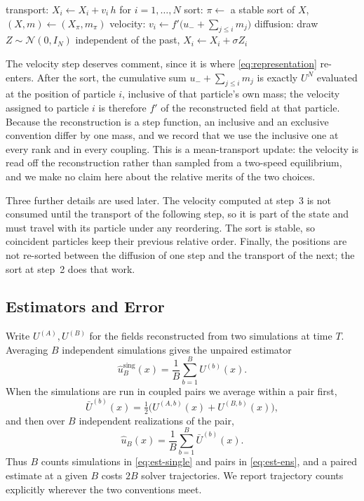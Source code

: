 \documentclass[smallextended,nospthms]{svjour3}
\theoremstyle{plain}
\theoremstyle{definition}
\theoremstyle{remark}
\numberwithin{equation}{section}
\begin{document}
\begin{algorithm}[htbp]
\caption{One step of a single simulation.}
\label{alg:single}
\SetAlgoLined
{}
transport: $X_i \leftarrow X_i + v_i\,h$ for $i=1,\dots,N$\;
sort: $\pi\leftarrow$ a stable sort of $X$, \quad $(X,m)\leftarrow(X_\pi,m_\pi)$\;
velocity: $v_i \leftarrow f'\!\bigl(u_- + \sum_{j\le i} m_j\bigr)$\;
diffusion: draw $Z\sim\mathcal N(0,I_N)$ independent of the past, \quad
  $X_i \leftarrow X_i + \sigma Z_i$\;
\end{algorithm}

The velocity step deserves comment, since it is where \eqref{eq:representation}
re-enters. After the sort, the cumulative sum $u_-+\sum_{j\le i}m_j$ is exactly
$U^N$ evaluated at the position of particle $i$, inclusive of that particle's
own mass; the velocity assigned to particle $i$ is therefore $f'$ of the
reconstructed field at that particle. Because the reconstruction is a step
function, an inclusive and an exclusive convention differ by one mass, and we
record that we use the inclusive one at every rank and in every coupling. This
is a mean-transport update: the velocity is read off the reconstruction rather
than sampled from a two-speed equilibrium, and we make no claim here about the
relative merits of the two choices.

Three further details are used later. The velocity computed at step~3 is not
consumed until the transport of the following step, so it is part of the state
and must travel with its particle under any reordering. The sort is stable, so
coincident particles keep their previous relative order. Finally, the positions
are not re-sorted between the diffusion of one step and the transport of the
next; the sort at step~2 does that work.

\subsection{Estimators and Error}
\label{sec:estimators}

Write $U^{(A)},U^{(B)}$ for the fields reconstructed from two simulations at
time $T$. Averaging $B$ independent simulations gives the unpaired estimator
\begin{equation}
 \hat u^{\mathrm{sing}}_B(x)=\frac1B\sum_{b=1}^{B}U^{(b)}(x).
 \label{eq:est-single}
\end{equation}
When the simulations are run in coupled pairs we average within a pair first,
\begin{equation}
 \bar U^{(b)}(x)=\tfrac12\bigl(U^{(A,b)}(x)+U^{(B,b)}(x)\bigr),
 \label{eq:est-pair}
\end{equation}
and then over $B$ independent realizations of the pair,
\begin{equation}
 \hat u_B(x)=\frac1B\sum_{b=1}^{B}\bar U^{(b)}(x).
 \label{eq:est-ens}
\end{equation}
Thus $B$ counts simulations in \eqref{eq:est-single} and pairs in
\eqref{eq:est-ens}, and a paired estimate at a given $B$ costs $2B$ solver
trajectories. We report trajectory counts explicitly wherever the two
conventions meet.
\end{document}
